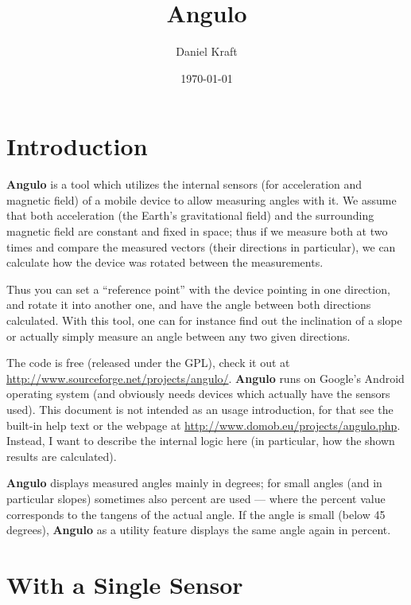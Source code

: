 \documentclass{article}
\title{Angulo}
\author{Daniel Kraft}
\date{\today}
\newcommand{\Angulo}[0]{\textbf{Angulo} }
\begin{document}
\maketitle

\section{Introduction}

\Angulo is a tool which utilizes the internal sensors (for acceleration and
magnetic field) of a mobile device to allow measuring angles with it.  We
assume that both acceleration (the Earth's gravitational field) and the
surrounding magnetic field are constant and fixed in space; thus if we
measure both at two times and compare the measured vectors (their directions
in particular), we can calculate how the device was rotated between the
measurements.

Thus you can set a ``reference point'' with the device pointing in one
direction, and rotate it into another one, and have the angle between both
directions calculated.  With this tool, one can for instance find out the
inclination of a slope or actually simply measure an angle between any two
given directions.

The code is free (released under the GPL), check it out at
\url{http://www.sourceforge.net/projects/angulo/}.  \Angulo runs on Google's
Android operating system (and obviously needs devices which actually
have the sensors used).  This document is not intended as an usage introduction,
for that see the built-in help text or the webpage at
\url{http://www.domob.eu/projects/angulo.php}.  Instead, I want to describe
the internal logic here (in particular, how the shown results are calculated).

\Angulo displays measured angles mainly in degrees; for small angles (and
in particular slopes) sometimes also percent are used --- where the percent
value corresponds to the tangens of the actual angle.  If the angle is small
(below 45 degrees), \Angulo as a utility feature displays the same angle
again in percent.

\section{With a Single Sensor}
\label{sec:singleValue}
\end{document}

